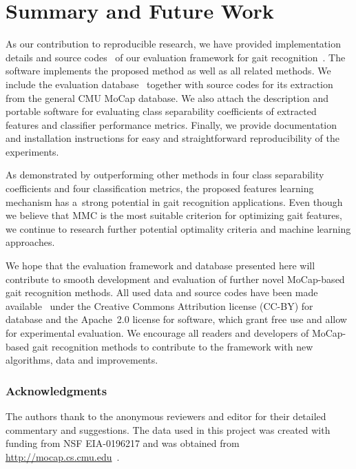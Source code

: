 \documentclass[10pt,a4paper]{llncs}
\begin{document}
\section{Summary and Future Work}
\label{summ}

As our contribution to reproducible research, we have provided implementation details and source codes~\cite{WWW1} of our evaluation framework for gait recognition~\cite{BS16a,BS16b}. The software implements the proposed method as well as all related methods. We include the evaluation database~\cite{WWW2} together with source codes for its extraction from the general CMU MoCap database. We also attach the description and portable software for evaluating class separability coefficients of extracted features and classifier performance metrics. Finally, we provide documentation and installation instructions for easy and straightforward reproducibility of the experiments.

As demonstrated by outperforming other methods in four class separability coefficients and four classification metrics, the proposed features learning mechanism has a~strong potential in gait recognition applications. Even though we believe that MMC is the most suitable criterion for optimizing gait features, we continue to research further potential optimality criteria and machine learning approaches.

We hope that the evaluation framework and database presented here will contribute to smooth development and evaluation of further novel MoCap-based gait recognition methods. All used data and source codes have been made available~\cite{WWW1,WWW2} under the Creative Commons Attribution license (CC-BY) for database and the Apache~2.0 license for software, which grant free use and allow for experimental evaluation. We encourage all readers and developers of MoCap-based gait recognition methods to contribute to the framework with new algorithms, data and improvements.

\vspace{-1pt}
\subsubsection*{Acknowledgments}
The authors thank to the anonymous reviewers and editor for their detailed commentary and suggestions. The data used in this project was created with funding from NSF EIA-0196217 and was obtained from \url{http://mocap.cs.cmu.edu}~\cite{CMU03}.



\end{document}
